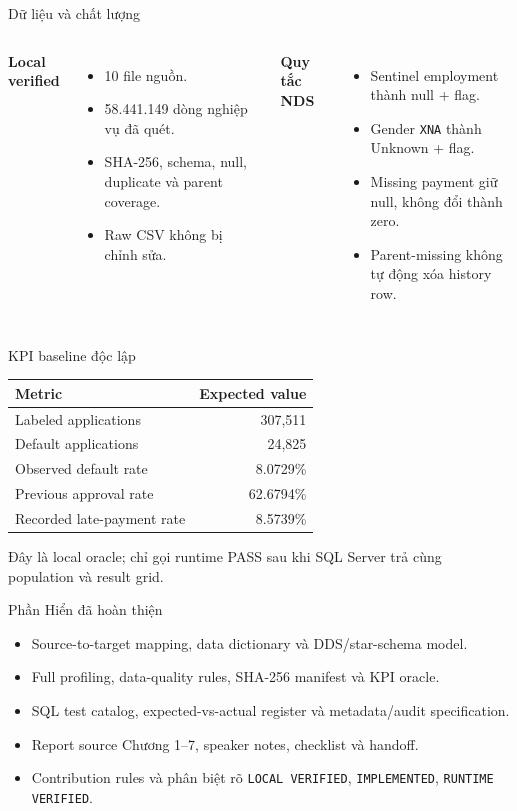 \documentclass[aspectratio=169,11pt]{beamer}
\begin{document}
\begin{frame}{Dữ liệu và chất lượng}
\begin{columns}[T]
\textbf{Local verified}
\begin{itemize}
  \item 10 file nguồn.
  \item 58.441.149 dòng nghiệp vụ đã quét.
  \item SHA-256, schema, null, duplicate và parent coverage.
  \item Raw CSV không bị chỉnh sửa.
\end{itemize}
\textbf{Quy tắc NDS}
\begin{itemize}
  \item Sentinel employment thành null + flag.
  \item Gender \texttt{XNA} thành Unknown + flag.
  \item Missing payment giữ null, không đổi thành zero.
  \item Parent-missing không tự động xóa history row.
\end{itemize}
\end{columns}
\end{frame}

\begin{frame}{KPI baseline độc lập}
\centering
\begin{tabular}{lr}
\toprule
Metric & Expected value \\
\midrule
Labeled applications & 307,511 \\
Default applications & 24,825 \\
Observed default rate & 8.0729\% \\
Previous approval rate & 62.6794\% \\
Recorded late-payment rate & 8.5739\% \\
\bottomrule
\end{tabular}

\vfill
\alert{Đây là local oracle; chỉ gọi runtime PASS sau khi SQL Server trả cùng population và result grid.}
\end{frame}

\begin{frame}{Phần Hiển đã hoàn thiện}
\begin{itemize}
  \item Source-to-target mapping, data dictionary và DDS/star-schema model.
  \item Full profiling, data-quality rules, SHA-256 manifest và KPI oracle.
  \item SQL test catalog, expected-vs-actual register và metadata/audit specification.
  \item Report source Chương 1--7, speaker notes, checklist và handoff.
  \item Contribution rules và phân biệt rõ \texttt{LOCAL VERIFIED}, \texttt{IMPLEMENTED}, \texttt{RUNTIME VERIFIED}.
\end{itemize}
\end{frame}
\end{document}
